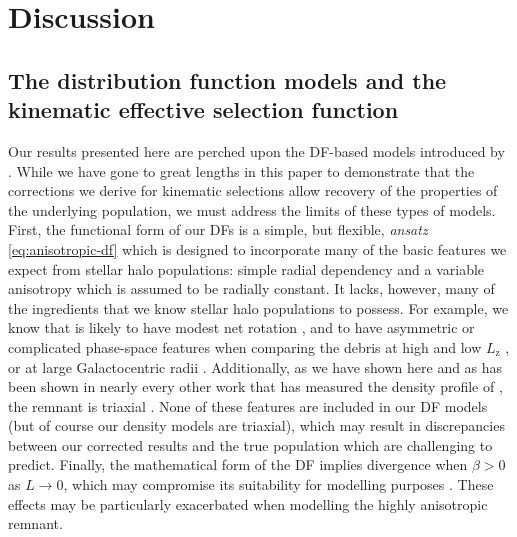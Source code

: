 \section{Discussion}
\label{sec:discussion}

\subsection{The distribution function models and the kinematic effective selection function}
\label{subsec:df-models-ksf-discussion}

Our results presented here are perched upon the DF-based models introduced by \cite{lane22}. While we have gone to great lengths in this paper to demonstrate that the corrections we derive for kinematic selections allow recovery of the properties of the underlying population, we must address the limits of these types of models. First, the functional form of our DFs is a simple, but flexible, \textit{ansatz} \eqref{eq:anisotropic-df} which is designed to incorporate many of the basic features we expect from stellar halo populations: simple radial dependency and a variable anisotropy which is assumed to be radially constant. It lacks, however, many of the ingredients that we know stellar halo populations to possess. For example, we know that \gse is likely to have modest net rotation \parencite{helmi18,lancaster19,iorio21}, and to have asymmetric or complicated phase-space features when comparing the debris at high and low $L_\mathrm{z}$ \parencite{helmi18,naidu20}, or at large Galactocentric radii \parencite{chandra23}. Additionally, as we have shown here and as has been shown in nearly every other work that has measured the density profile of \gse, the remnant is triaxial \parencite{iorio19,han22}. None of these features are included in our DF models (but of course our density models are triaxial), which may result in discrepancies between our corrected results and the true \gse population which are challenging to predict. Finally, the mathematical form of the DF implies divergence when $\beta > 0$ as $L \rightarrow 0$, which may compromise its suitability for modelling purposes \parencite[as discussed by ][]{binney14}. These effects may be particularly exacerbated when modelling the highly anisotropic \gse remnant.

